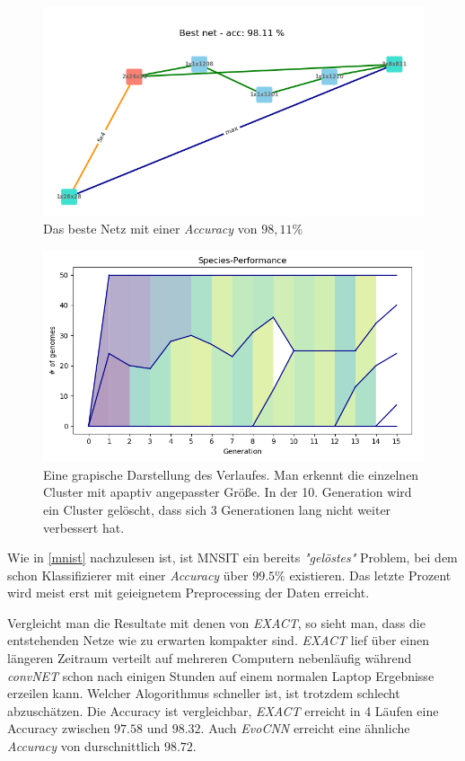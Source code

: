 \documentclass[]{scrartcl}
\begin{document}
			\begin{figure}[h]
				\centering
				\includegraphics[scale=0.6]{img/bestnet.png}
				\caption{Das beste Netz mit einer \textit{Accuracy} von $98,11 \%$}
				\label{fig:b1}
			\end{figure}

			\begin{figure}[h]
				\centering
				\includegraphics[scale=0.6]{img/verlauf.png}
				\caption{Eine grapische Darstellung des Verlaufes. Man erkennt die einzelnen Cluster mit apaptiv angepasster Größe. In der 10. Generation
						wird ein Cluster gelöscht, dass sich 3 Generationen lang nicht weiter verbessert hat.}
				\label{fig:b2}
			\end{figure}

			Wie in \ref{mnist} nachzulesen ist, ist MNSIT ein bereits \textit{"gelöstes"} Problem, bei dem schon Klassifizierer mit einer \textit{Accuracy} über $99.5\%$ existieren.
			Das letzte Prozent wird meist erst mit geieignetem Preprocessing der Daten erreicht.

			Vergleicht man die Resultate mit denen von \textit{EXACT}, so sieht man, dass die entstehenden Netze wie zu erwarten kompakter sind.
			\textit{EXACT} lief über einen längeren Zeitraum verteilt auf mehreren Computern nebenläufig während \textit{convNET} schon nach einigen Stunden auf einem normalen Laptop
			Ergebnisse erzeilen kann. Welcher Alogorithmus schneller ist, ist trotzdem schlecht abzuschätzen.
			Die Accuracy ist vergleichbar, \textit{EXACT} erreicht in 4 Läufen eine Accuracy zwischen $97.58$ und $98.32$.
			Auch \textit{EvoCNN} erreicht eine ähnliche \textit{Accuracy} von durschnittlich $98.72$.
\end{document}
